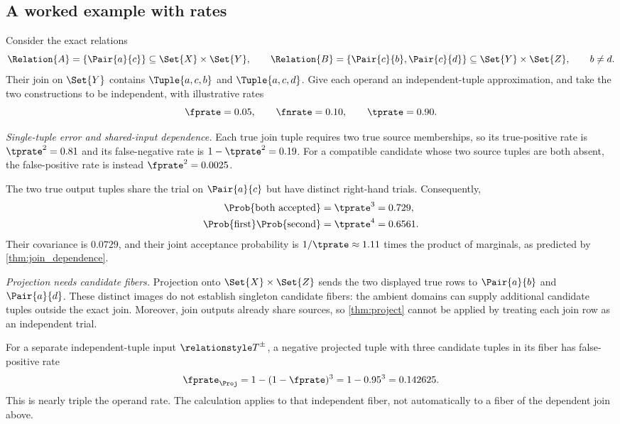 \documentclass[ ../main.tex]{subfiles}
\begin{document}
\subsection{A worked example with rates}
\label{sec:rel_example}
Consider the exact relations
\begin{equation}
 \Relation{A}=\{\Pair{a}{c}\}\subseteq\Set{X}\times\Set{Y},\qquad
 \Relation{B}=\{\Pair{c}{b},\Pair{c}{d}\}
 \subseteq\Set{Y}\times\Set{Z},\qquad b\ne d.
\end{equation}
Their join on $\Set{Y}$ contains $\Tuple{a,c,b}$ and $\Tuple{a,c,d}$.
Give each operand an independent-tuple approximation, and take the two
constructions to be independent, with illustrative rates
\begin{equation}
 \fprate=0.05,\qquad \fnrate=0.10,\qquad \tprate=0.90.
\end{equation}

\begin{example}
\emph{Single-tuple error and shared-input dependence.}
Each true join tuple requires two true source memberships, so its
true-positive rate is $\tprate^2=0.81$ and its false-negative rate is
$1-\tprate^2=0.19$. For a compatible candidate whose two source tuples
are both absent, the false-positive rate is instead
$\fprate^2=0.0025$.

The two true output tuples share the trial on $\Pair{a}{c}$ but have
distinct right-hand trials. Consequently,
\begin{align}
 \Prob{\text{both accepted}}&=\tprate^3=0.729,\\
 \Prob{\text{first}}\Prob{\text{second}}&=\tprate^4=0.6561.
\end{align}
Their covariance is $0.0729$, and their joint acceptance probability is
$1/\tprate\approx1.11$ times the product of marginals, as predicted by
\cref{thm:join_dependence}.

\emph{Projection needs candidate fibers.}
Projection onto $\Set{X}\times\Set{Z}$ sends the two displayed true rows to
$\Pair{a}{b}$ and $\Pair{a}{d}$. These distinct images do not establish
singleton candidate fibers: the ambient domains can supply additional
candidate tuples outside the exact join. Moreover, join outputs already
share sources, so \cref{thm:project} cannot be applied by treating each join
row as an independent trial.

For a separate independent-tuple input $\ARelation{T}$, a negative projected
tuple with three candidate tuples in its fiber has false-positive rate
\begin{equation}
 \fprate_\Proj=1-(1-\fprate)^3=1-0.95^3=0.142625.
\end{equation}
This is nearly triple the operand rate. The calculation applies to that
independent fiber, not automatically to a fiber of the dependent join above.
\end{example}
\end{document}
